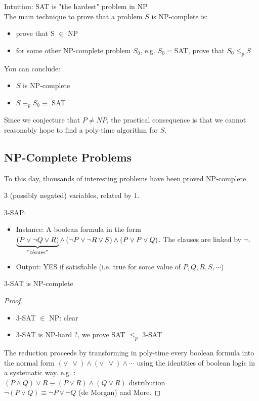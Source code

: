 Intuition: SAT is "the hardest" problem in NP \\
The main technique to prove that a problem $S$ is NP-complete is:
\begin{itemize}
\item prove that S $\in$ NP
\item for some other NP-complete problem $S_0$, e.g. $S_0=$SAT, prove that $S_0 \leq_p S$
\end{itemize}
You can conclude:
\begin{itemize}
\item $S$ is NP-complete
\item $S \equiv_p S_0 \equiv$ SAT
\end{itemize}
Since we conjecture that $P\neq NP$, the practical consequence is that we cannot reasonably hope to find a poly-time algorithm for $S$. 
 
\subsection{NP-Complete Problems}

To this day, thousands of interesting problems have been proved NP-complete.

\begin{example}
\begin{leftbar}
$3$ (possibly negated) variables, related by $1$.
\begin{definition}
3-SAP:
\begin{itemize}
\item Instance: A boolean formula in the form $\underbrace{\left( P \vee \neg Q \vee R \right)}_{"clause"} \wedge \left( \neg P \vee \neg R \vee S \right) \wedge \left( P \vee P  \vee Q \right)$. The clauses are linked by $\neg$.
\item Output: YES if satisfiable (i.e. true for some value of $P,Q,R,S,\cdots$) 
\end{itemize}
\end{definition}
\end{leftbar}
\end{example}

\begin{theorem}
3-SAT is NP-complete
\end{theorem}
\begin{proof}
\begin{itemize}
\item 3-SAT $\in$ NP: clear
\item 3-SAT is NP-hard ?, we prove SAT $\leq_p$ 3-SAT
\end{itemize}

The reduction proceeds by transforming in poly-time every boolean formula into the normal form $( \vee \ \ \vee ) \wedge ( \vee \ \ \vee) \wedge \cdots$ using the identities of boolean logic in a systematic way. e.g. : \\
$(P \wedge Q) \vee R \equiv (P \vee R) \wedge (Q \vee R)$ distribution \\
$ \neg (P \vee Q) \equiv \neg P \vee \neg Q$ (de Morgan) and More. 
\end{proof}

